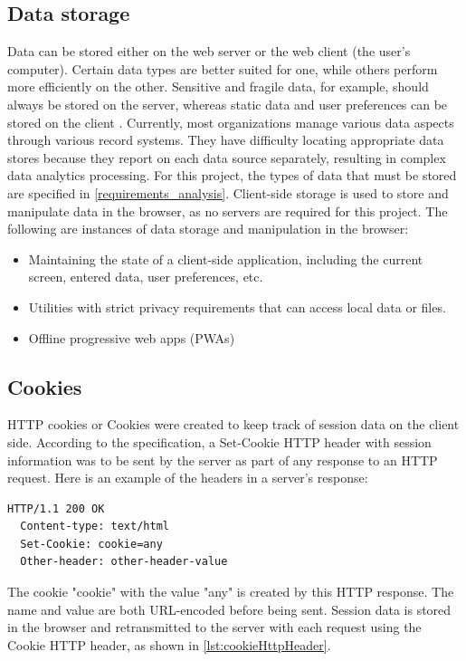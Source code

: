\subsection{Data storage}
Data can be stored either on the web server or the web client (the user's computer). Certain data types are better suited for one, while others perform more efficiently on the other. Sensitive and fragile data, for example, should always be stored on the server, whereas static data and user preferences can be stored on the client \autocite{macdonald2013html5}. Currently, most organizations manage various data aspects through various record systems. They have difficulty locating appropriate data stores because they report on each data source separately, resulting in complex data analytics processing. For this project, the types of data that must be stored are specified in \autoref{requirements_analysis}. Client-side storage is used to store and manipulate data in the browser, as no servers are required for this project. The following are instances of data storage and manipulation in the browser:

\begin{itemize}
  \item Maintaining the state of a client-side application, including the current screen, entered data, user preferences, etc.
  \item Utilities with strict privacy requirements that can access local data or files.
  \item Offline progressive web apps (PWAs)
\end{itemize}

\subsection*{Cookies}
HTTP cookies or Cookies were created to keep track of session data on the client side. According to the specification, a Set-Cookie HTTP header with session information was to be sent by the server as part of any response to an HTTP request. Here is an example of the headers in a server's response:

\begin{lstlisting}[language={}, caption={Cookie server response's headers}]
  HTTP/1.1 200 OK
  Content-type: text/html
  Set-Cookie: cookie=any
  Other-header: other-header-value
\end{lstlisting}

The cookie "cookie" with the value "any" is created by this HTTP response. The name and value are both URL-encoded before being sent. Session data is stored in the browser and retransmitted to the server with each request using the Cookie HTTP header, as shown in \autoref{lst:cookieHttpHeader}.


